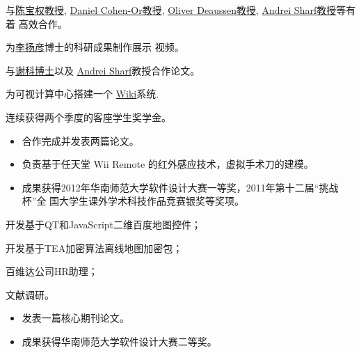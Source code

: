 \documentclass[11pt,a4paper,nolmodern]{moderncv}
\begin{document}

{
\begin{tightitemize}%
 \item 与\href{http://web.siat.ac.cn/~baoquan/}{陈宝权教授},
   \href{http://www.math.tau.ac.il/~dcor/}{Daniel Cohen-Or教授},
   \href{http://graphics.uni-konstanz.de/mitarbeiter/deussen.php}{Oliver
     Deaussen教授}, \href{http://www.idav.ucdavis.edu/~asharf/}{Andrei Sharf教授}等有着
   高效合作。
 \item 为\href{http://web.siat.ac.cn/~yangyan/}{李扬彦}博士的科研成果制作展示
   视频。
 \item 与\href{http://web.siat.ac.cn/~kexie}{谢科博士}以及
   \href{http://www.idav.ucdavis.edu/~asharf/}{Andrei Sharf}教授合作论文。
 \item 为可视计算中心搭建一个
   \href{http://vcc.siat.ac.cn/w/index.php/Main_Page}{Wiki}系统.   
 \item 连续获得两个季度的客座学生奖学金。
 \end{tightitemize}}

%
  {
\begin{itemize}
 \item 合作完成并发表两篇论文。
 \item 负责基于任天堂 Wii Remote 的红外感应技术，虚拟手术刀的建模。
 \item 成果获得2012年华南师范大学软件设计大赛一等奖，2011年第十二届“挑战杯”全
   国大学生课外学术科技作品竞赛银奖等奖项。
\end{itemize}}

{
\begin{tightitemize}%
 \item 开发基于QT和JavaScript二维百度地图控件；
 \item 开发基于TEA加密算法离线地图加密包；
 \item 百维达公司HR助理；
 \item 文献调研。
 \end{tightitemize}}

%
  {
\begin{itemize}
 \item 发表一篇核心期刊论文。
 \item 成果获得华南师范大学软件设计大赛二等奖。
\end{itemize}}
\end{document}
